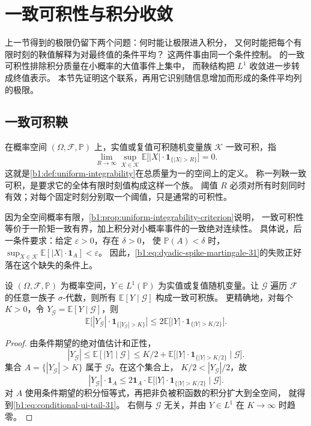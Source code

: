 \section{一致可积性与积分收敛}
\label{b1:sec:3106}

上一节得到的极限仍留下两个问题：何时能让极限进入积分，
又何时能把每个有限时刻的鞅值解释为对最终值的条件平均？
这两件事由同一个条件控制。
的一致可积性排除积分质量在小概率的大值事件上集中，
而鞅结构把 \(L^1\) 收敛进一步转成终值表示。
本节先证明这个联系，再用它识别随信息增加而形成的条件平均列的极限。

\subsection{一致可积鞅}
\label{b1:subsec:310601}

在概率空间 \((\Omega,\mathcal F,\mathbb P)\) 上，实值或复值可积随机变量族
\(\mathcal K\) 一致可积，指
\[
 \lim_{R\to\infty}\sup_{X\in\mathcal K}
       \mathbb E\bigl[|X|\cdot\mathbf1_{\{|X|>R\}}\bigr]=0.
\]
这就是\cref{b1:def:uniform-integrability}在总质量为一的空间上的定义。
称一列鞅一致可积，是要求它的全体有限时刻值构成这样一个族。
阈值 \(R\) 必须对所有时刻同时有效；对每个固定时刻分别取一个阈值，只是通常的可积性。

\ProseParagraphBreak

因为全空间概率有限，\cref{b1:prop:uniform-integrability-criterion}说明，
一致可积性等价于一阶矩一致有界，加上积分对小概率事件的一致绝对连续性。
具体说，后一条件要求：给定 \(\varepsilon>0\)，存在 \(\delta>0\)，
使 \(\mathbb P(A)<\delta\) 时，\(\sup_{X\in\mathcal K}\mathbb E[|X|\cdot\mathbf1_A]<\varepsilon\)。
因此，\eqref{b1:eq:dyadic-spike-martingale-31}的失败正好落在这个缺失的条件上。

\begin{lemma}[条件平均的一致可积性]
\label{b1:lem:conditional-expectations-ui-31}
设 \((\Omega,\mathcal F,\mathbb P)\) 为概率空间，\(Y\in L^1(\mathbb P)\)
为实值或复值随机变量。让 \(\mathcal G\) 遍历 \(\mathcal F\) 的任意一族子
\(\sigma\)-代数，则所有 \(\mathbb E[Y\mid\mathcal G]\) 构成一致可积族。
更精确地，对每个 \(K>0\)，令 \(Y_{\mathcal G}=\mathbb E[Y\mid\mathcal G]\)，则
\begin{equation}
 \mathbb E\bigl[|Y_{\mathcal G}|\cdot
                 \mathbf1_{\{|Y_{\mathcal G}|>K\}}\bigr]
 \leq2\mathbb E\bigl[|Y|\cdot\mathbf1_{\{|Y|>K/2\}}\bigr].
 \label{b1:eq:conditional-ui-tail-31}
\end{equation}
\end{lemma}
\begin{proof}
由条件期望的绝对值估计和正性，
\[
 |Y_{\mathcal G}|
 \leq\mathbb E[|Y|\mid\mathcal G]
 \leq K/2+\mathbb E\bigl[|Y|\cdot\mathbf1_{\{|Y|>K/2\}}\mid\mathcal G\bigr].
\]
集合 \(A=\{|Y_{\mathcal G}|>K\}\) 属于 \(\mathcal G\)。在这个集合上，
\(K/2<|Y_{\mathcal G}|/2\)，故
\[
 |Y_{\mathcal G}|\cdot\mathbf1_A
 \leq2\mathbf1_A\cdot
 \mathbb E\bigl[|Y|\cdot\mathbf1_{\{|Y|>K/2\}}\mid\mathcal G\bigr].
\]
对 \(A\) 使用条件期望的积分恒等式，再把非负被积函数的积分扩大到全空间，
就得到\eqref{b1:eq:conditional-ui-tail-31}。
右侧与 \(\mathcal G\) 无关，并由 \(Y\in L^1\) 在 \(K\to\infty\) 时趋零。
\end{proof}

